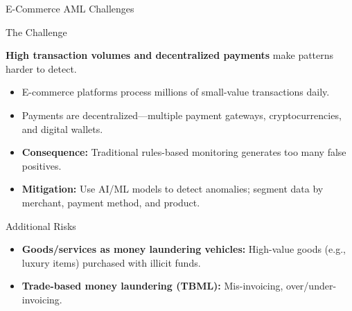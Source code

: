 \documentclass{beamer}
\begin{document}
	\begin{frame}{E-Commerce AML Challenges}
		\begin{block}{The Challenge}
			\begin{center}
				\textbf{High transaction volumes and decentralized payments} make patterns harder to detect.
			\end{center}
		\end{block}
		\begin{itemize}
			\item E-commerce platforms process millions of small-value transactions daily.
			\item Payments are decentralized—multiple payment gateways, cryptocurrencies, and digital wallets.
			\item \textbf{Consequence:} Traditional rules-based monitoring generates too many false positives.
			\item \textbf{Mitigation:} Use AI/ML models to detect anomalies; segment data by merchant, payment method, and product.
		\end{itemize}
		\begin{block}{Additional Risks}
			\begin{itemize}
				\item \textbf{Goods/services as money laundering vehicles:} High-value goods (e.g., luxury items) purchased with illicit funds.
				\item \textbf{Trade-based money laundering (TBML):} Mis-invoicing, over/under-invoicing.
			\end{itemize}
		\end{block}
	\end{frame}
	
\end{document}

